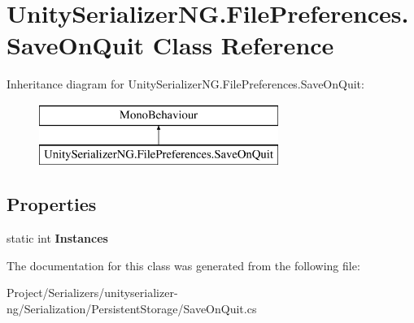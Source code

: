\hypertarget{class_unity_serializer_n_g_1_1_file_preferences_1_1_save_on_quit}{}\section{Unity\+Serializer\+N\+G.\+File\+Preferences.\+Save\+On\+Quit Class Reference}
\label{class_unity_serializer_n_g_1_1_file_preferences_1_1_save_on_quit}
Inheritance diagram for Unity\+Serializer\+N\+G.\+File\+Preferences.\+Save\+On\+Quit\+:\begin{figure}[H]
\begin{center}
\leavevmode
\includegraphics[height=2.000000cm]{class_unity_serializer_n_g_1_1_file_preferences_1_1_save_on_quit}
\end{center}
\end{figure}
\subsection*{Properties}
\begin{DoxyCompactItemize}
\item 
\mbox{\label{class_unity_serializer_n_g_1_1_file_preferences_1_1_save_on_quit_a9cc9017491fa2c84553ac9f4cbaa39a7}} 
static int {\bfseries Instances}
\end{DoxyCompactItemize}


The documentation for this class was generated from the following file\+:\begin{DoxyCompactItemize}
\item 
Project/\+Serializers/unityserializer-\/ng/\+Serialization/\+Persistent\+Storage/Save\+On\+Quit.\+cs\end{DoxyCompactItemize}
